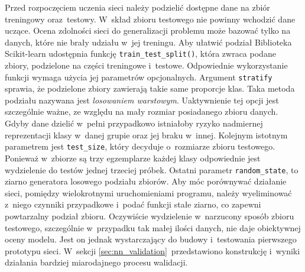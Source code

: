 Przed rozpoczęciem uczenia sieci należy podzielić dostępne dane na zbiór
treningowy oraz~testowy.
W~skład zbioru testowego nie powinny wchodzić dane uczące.
Ocena zdolności sieci do generalizacji problemu może bazować tylko na danych,
które nie brały udziału w~jej treningu.
Aby ułatwić podział Biblioteka Scikit-learn udostępnia funkcję
\texttt{train_test_split()}, która zwraca podane zbiory, podzielone
na części treningowe i~testowe.
Odpowiednie wykorzystanie funkcji wymaga użycia jej parametrów opcjonalnych.
Argument \texttt{stratify} sprawia, że podzielone zbiory zawierają
takie same proporcje klas.
Taka metoda podziału nazywana jest \emph{losowaniem warstowym}.
Uaktywnienie tej opcji jest szczególnie ważne, ze względu na mały rozmiar
posiadanego zbioru danych.
Gdyby dane dzielić w~pełni przypadkowo istniałoby ryzyko nadmiernej
reprezentacji klasy w~danej grupie oraz jej braku w~innej.
Kolejnym istotnym parametrem jest \texttt{test_size}, który decyduje
o~rozmiarze zbioru testowego.
Ponieważ w~zbiorze są trzy egzemplarze każdej klasy odpowiednie jest wydzielenie
do testów jednej trzeciej próbek.
Ostatni parametr \texttt{random_state}, to ziarno generatora
losowego podziału zbiorów.
Aby móc porównywać działanie sieci, pomiędzy wielokrotnymi uruchomieniami
programu, należy wyeliminować z~niego czynniki przypadkowe i~podać funkcji stałe
ziarno, co zapewni powtarzalny podział zbioru.
Oczywiście wydzielenie w~narzucony sposób zbioru testowego, szczególnie
w~przypadku tak małej ilości danych, nie daje obiektywnej oceny modelu.
Jest on jednak wystarczający do budowy i~testowania pierwszego prototypu sieci.
W~sekcji \ref{sec:nn_validation}~przedstawiono konstrukcję i~wyniki działania
bardziej miarodajnego procesu walidacji.


